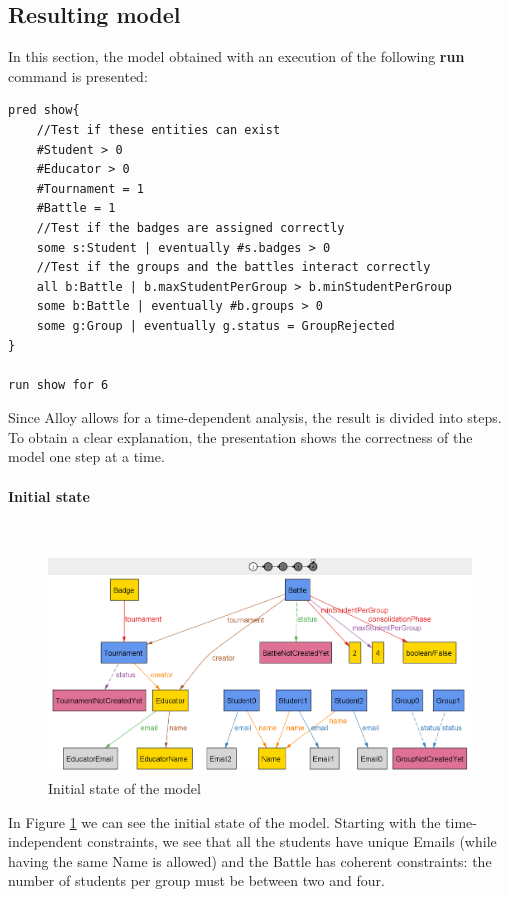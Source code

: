 \newpage

\subsection{Resulting model}
In this section, the model obtained with an execution of the following \textbf{run} command is presented:

\begin{verbatim}
pred show{
    //Test if these entities can exist
    #Student > 0
    #Educator > 0
    #Tournament = 1
    #Battle = 1
    //Test if the badges are assigned correctly
    some s:Student | eventually #s.badges > 0
    //Test if the groups and the battles interact correctly
    all b:Battle | b.maxStudentPerGroup > b.minStudentPerGroup
    some b:Battle | eventually #b.groups > 0
    some g:Group | eventually g.status = GroupRejected
}

run show for 6
\end{verbatim}
Since Alloy allows for a time-dependent analysis, the result is divided into steps. To obtain a clear explanation, the presentation shows the correctness of the model one step at a time.

\newpage

\paragraph{Initial state}
\textbf{ }\\

\begin{figure}[h]
    \centering
    \includegraphics[scale=0.45]{Images/AlloyStep0.png}
    \caption{Initial state of the model}
    \label{fig:step0}
\end{figure}

In Figure \ref{fig:step0} we can see the initial state of the model. Starting with the time-independent constraints, we see that all the students have unique Emails (while having the same Name is allowed) and the Battle has coherent constraints: the number of students per group must be between two and four.

